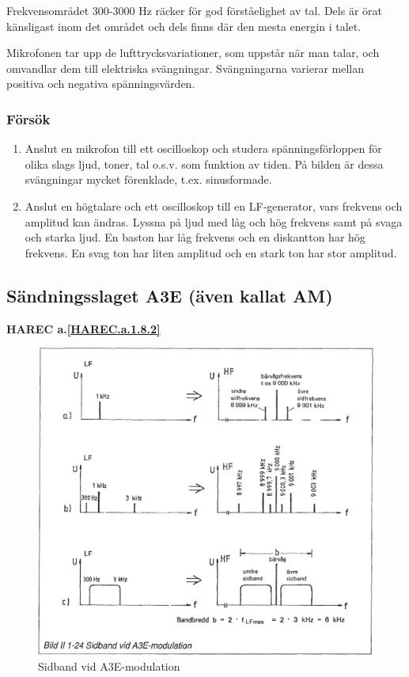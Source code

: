 Frekvensområdet 300-3000 Hz räcker för god förståelighet av tal. Dels är örat
känsligast inom det området och dels finns där den mesta energin i talet.

Mikrofonen tar upp de lufttrycksvariationer, som uppstår när man talar, och
omvandlar dem till elektriska svängningar. Svängningarna varierar mellan
positiva och negativa spänningsvärden.

\subsubsection{Försök}

\begin{enumerate}
\item Anslut en mikrofon till ett oscilloskop och studera spänningsförloppen
för olika slags ljud, toner, tal o.s.v. som funktion av tiden. På bilden är
dessa svängningar mycket förenklade, t.ex. sinusformade.

\item Anslut en högtalare och ett oscilloskop till en LF-generator, vars
frekvens och amplitud kan ändras. Lyssna på ljud med låg och hög frekvens samt
på svaga och starka ljud. En baston har låg frekvens och en diskantton har hög
frekvens. En svag ton har liten amplitud och en stark ton har stor amplitud.
\end{enumerate}

\subsection{Sändningsslaget A3E (även kallat AM)}
\textbf{HAREC a.\ref{HAREC.a.1.8.2}\label{myHAREC.a.1.8.2}}

\begin{figure}[ht]
\begin{center}
\includegraphics[width=14cm]{images/bild_2_1-24}
\caption{Sidband vid A3E-modulation}
\label{fig:BildII1-24}
\end{center}
\end{figure}

